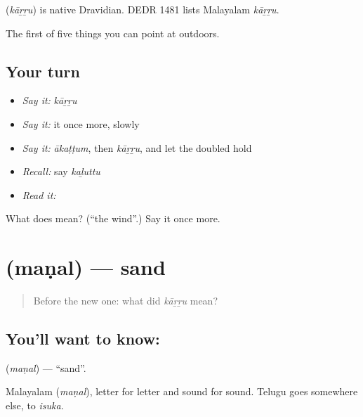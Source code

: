 \begin{cousinweb}
\textbf{} (\emph{kāṟṟu}) is native Dravidian. DEDR 1481 lists Malayalam \emph{kāṟṟu}.
\end{cousinweb}

\begin{grammarlens}[title={What you've built}]
The first of five things you can point at outdoors.
\end{grammarlens}

\subsection*{Your turn}
\begin{itemize}
\raggedright
  \item \emph{Say it:} \emph{kāṟṟu}
  \item \emph{Say it:} it once more, slowly
  \item \emph{Say it:} \emph{ākaṭṭum}, then \emph{kāṟṟu}, and let the doubled  hold
  \item \emph{Recall:} say \emph{kaḻuttu}
  \item \emph{Read it:} \textbf{}
\end{itemize}

\begin{tcolorbox}[breakable,colback=teal!4,colframe=teal!35!black,title={Before you move on}]
What does  mean? (\textquotedblleft{}the wind\textquotedblright{}.) Say it once more.
\end{tcolorbox}
\section[\texorpdfstring{\ta{மணல்} (maṇal)}{மணல் (maṇal)}]{ (maṇal) — sand}

\label{lesson:TA-C57-sand}



\begin{quote}
Before the new one: what did \emph{kāṟṟu} mean?
\end{quote}

\subsection*{You'll want to know: }
\textbf{} (\emph{maṇal}) — \textquotedblleft{}sand\textquotedblright{}.

Malayalam  (\emph{maṇal}), letter for letter and sound for sound. Telugu goes somewhere else, to \emph{isuka}.

